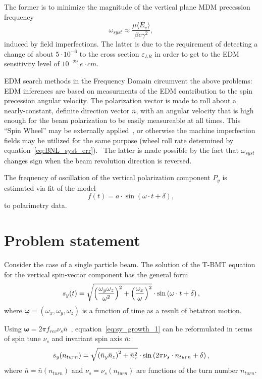 \documentclass[a4paper]{jacow}
\renewcommand{\vec}{\boldsymbol}
\newcommand{\w}{\omega}
\newcommand{\avg}[1]{\langle {#1} \rangle}
\newcommand{\nbar}{\bar n}
\begin{document}
The former is to minimize the magnitude of
the vertical plane MDM precession frequency~\cite[p.~11]{BNL:Deuteron2008}
\begin{equation}\label{eq:BNL_syst_err}
\w_{syst} \approx \frac{\mu\avg{E_v}}{\beta c\gamma^2},
\end{equation}
induced by field imperfections. The latter is due to the requirement of detecting a change of about
$5\cdot 10^{-6}$ to the cross section $\varepsilon_{LR}$ in order to get to the EDM sensitivity level
of $10^{-29}~e\cdot cm$.~\cite[p.~18]{BNL:Deuteron2008}

EDM search methods in the Frequency Domain circumvent the above problems: EDM inferences are based
on measurments of the EDM contribution to the spin precession angular velocity. The polarization vector is made to
roll about a nearly-constant, definite direction vector $\nbar$, with an angular velocity
that is high enough for the beam polarization to be easily measureable at all times. This ``Spin Wheel'' may be
externally applied~\cite{Koop:IPAC13-TUPWO040}, or otherwise the machine imperfection fields
may be utilized for the same purpose (wheel roll rate determined by
equation~\eqref{eq:BNL_syst_err}).~\cite{Senichev:2017amn} The latter is made possible
by the fact that $\w_{syst}$ changes sign when the beam revolution direction
is reversed.~\cite[p.~11]{BNL:Deuteron2008}

The frequency of oscillation of the vertical polarization component $P_y$ is estimated
via fit of the model
\begin{equation}\label{eq:fit_model}
  f(t) = a\cdot\sin(\w\cdot t + \delta),
\end{equation}
to polarimetry data.

\section{Problem statement}
\newcommand{\ntrn}{n_{turn}}
Consider the case of a single particle beam. The solution of the T-BMT equation for the
vertical spin-vector component has the general form
\begin{equation}\label{eq:sy_growth_1}
  s_y(t) = \sqrt{\bkt{\frac{\w_y\w_z}{\w^2}}^2 + \bkt{\frac{\w_x}{\w}}^2}\cdot\sin\bkt{\w\cdot t + \delta},
\end{equation}
where $\vec\w = (\w_x, \w_y, \w_z)$ is a function of time as a result of betatron motion.

Using $\vec\w = 2\pi f_{rev}\nu_s\nbar$~\cite[p.~4]{COSY:SpinTuneMapping}, equation~\eqref{eq:sy_growth_1}
can be reformulated in terms of spin tune $\nu_s$ and invariant spin axis $\bar n$:
\begin{equation}\label{eq:main}
  s_y(n_{turn}) = \sqrt{\bkt{\nbar_y\nbar_z}^2 + \nbar_x^2}\cdot\sin\bkt{2\pi\nu_s\cdot\ntrn + \delta},
\end{equation}
where $\nbar = \nbar(\ntrn)$ and $\nu_s = \nu_s(\ntrn)$ are functions of the turn number $\ntrn$.
\end{document}
